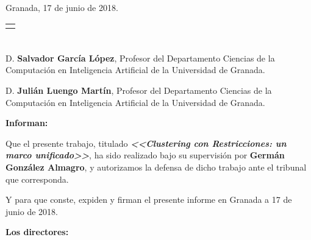 \vspace{0.1cm}

\begin{flushright}
	Granada, 17 de junio de 2018.
\end{flushright}

\vspace{2cm}

\begin{center}
	
	\begin{tabular}{m{6cm}}
		\\ \hline
		\centering{Fdo. \myName} \\
	\end{tabular}
	
\end{center}


\chapter*{}
\thispagestyle{empty}


D. \textbf{Salvador García López}, Profesor del Departamento Ciencias de la Computación en Inteligencia Artificial de la Universidad de Granada.

\vspace{0.5cm}

D. \textbf{Julián Luengo Martín}, Profesor del Departamento Ciencias de la Computación en Inteligencia Artificial de la Universidad de Granada.


\vspace{0.5cm}

\textbf{Informan:}

\vspace{0.5cm}

Que el presente trabajo, titulado \textit{\textbf{<<Clustering con Restricciones: un marco unificado>>}},
ha sido realizado bajo su supervisión por \textbf{Germán González Almagro}, y autorizamos la defensa de dicho trabajo ante el tribunal
que corresponda.

\vspace{0.5cm}

Y para que conste, expiden y firman el presente informe en Granada a 17 de junio de 2018.

\vspace{1cm}

\textbf{Los directores:}


